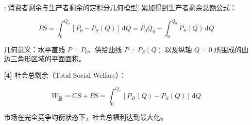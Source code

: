 \documentclass[11pt,a4paper,UTF8]{ctexart}
\begin{document}
\begin{thmbox}[模型[7]: 消费者剩余与生产者剩余的定积分几何模型]
累加得到生产者剩余总额公式：


\begin{equation*}
PS = \int_0^{Q_0} [P_0 - P_S(Q)]\,\mathrm{d}Q = P_0 Q_0 - \int_0^{Q_0} P_S(Q)\,\mathrm{d}Q
\end{equation*}


几何意义：水平直线 $P = P_0$、供给曲线 $P = P_S(Q)$ 以及纵轴 $Q = 0$ 所围成的曲边三角形区域的平面面积。

\textbf{[4]} 社会总剩余（Total Social Welfare）：

\begin{equation*}
W_{\text{总}} = CS + PS = \int_0^{Q_0} [P_D(Q) - P_S(Q)]\,\mathrm{d}Q
\end{equation*}


市场在完全竞争均衡状态下，社会总福利达到最大化。
\end{thmbox}
\end{document}

